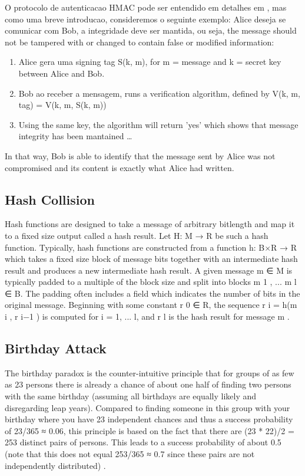 \documentclass[12pt]{article}
\begin{document}
O protocolo de autenticacao HMAC pode ser entendido em detalhes em \cite{krawczyk1997hmac}, mas como uma breve
introducao, consideremos o seguinte exemplo: Alice deseja se comunicar com Bob, a integridade deve ser
mantida, ou seja, the message should not be tampered with or changed to contain false or modified information:
\begin{enumerate}
\item Alice gera uma signing tag S(k, m), for m = message and k = secret key between Alice and Bob.
\item Bob ao receber a mensagem, runs a verification algorithm, defined by V(k, m, tag) = V(k, m, S(k, m))
\item Using the same key, the algorithm will return 'yes' which shows that message integrity has been mantained \ldots
\end{enumerate}

In that way, Bob is able to identify that the message sent by Alice was not compromised and its content
is exactly what Alice had written.

\subsection{Hash Collision}

Hash functions are designed to take a message of arbitrary bitlength and map it to a fixed size
output called a hash result. Let H: M → R be such a hash function. Typically, hash functions are
constructed from a function h: B×R → R which takes a fixed size block of message bits together
with an intermediate hash result and produces a new intermediate hash result. A given message
m ∈ M is typically padded to a multiple of the block size and split into blocks m 1 , ... m l ∈ B. The
padding often includes a field which indicates the number of bits in the original message.
Beginning with some constant r 0 ∈ R, the sequence r i = h(m i , r i−1 ) is computed for i = 1, ... l, and
r l is the hash result for message m \cite{van1999parallel}.

\subsection{Birthday Attack}

The birthday paradox is the counter-intuitive principle that for
groups of as few as 23 persons there is already a chance of about one half of finding two 
persons with the same birthday (assuming all birthdays are equally likely and disregarding 
leap years). Compared to finding someone in this group with your birthday where you have 
23 independent chances and thus a success probability of 23/365 ≈ 0.06, this principle is 
based on the fact that there are (23 * 22)/2 = 253 distinct pairs of persons. This leads to 
a success probability of about 0.5 (note that this does not equal 253/365 ≈ 0.7 since these 
pairs are not independently distributed) \cite{stevens2012attacks}.
\end{document}
